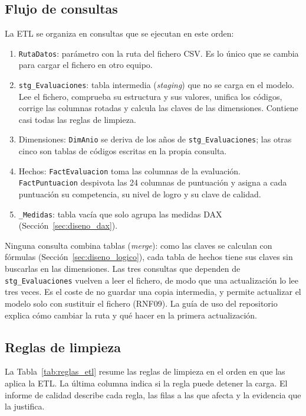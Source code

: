 \documentclass[12pt, a4paper, oneside]{report}
\begin{document}
\subsection{Flujo de consultas}
\label{sec:flujo_consultas}
La ETL se organiza en consultas que se ejecutan en este orden:
\begin{enumerate}
    \item \texttt{RutaDatos}: parámetro con la ruta del fichero CSV. Es lo único que se cambia para cargar el fichero en otro equipo.
    \item \texttt{stg\_Evaluaciones}: tabla intermedia (\textit{staging}) que no se carga en el modelo. Lee el fichero, comprueba su estructura y sus valores, unifica los códigos, corrige las columnas rotadas y calcula las claves de las dimensiones. Contiene casi todas las reglas de limpieza.
    \item Dimensiones: \texttt{DimAnio} se deriva de los años de \texttt{stg\_Evaluaciones}; las otras cinco son tablas de códigos escritas en la propia consulta.
    \item Hechos: \texttt{FactEvaluacion} toma las columnas de la evaluación. \texttt{FactPuntuacion} despivota las 24 columnas de puntuación y asigna a cada puntuación su competencia, su nivel de logro y su clave de calidad.
    \item \texttt{\_Medidas}: tabla vacía que solo agrupa las medidas DAX (Sección~\ref{sec:diseno_dax}).
\end{enumerate}

Ninguna consulta combina tablas (\textit{merge}): como las claves se calculan con fórmulas (Sección~\ref{sec:diseno_logico}), cada tabla de hechos tiene sus claves sin buscarlas en las dimensiones. Las tres consultas que dependen de \texttt{stg\_Evaluaciones} vuelven a leer el fichero, de modo que una actualización lo lee tres veces. Es el coste de no guardar una copia intermedia, y permite actualizar el modelo solo con sustituir el fichero (RNF09). La guía de uso del repositorio explica cómo cambiar la ruta y qué hacer en la primera actualización.

\subsection{Reglas de limpieza}
\label{sec:reglas_limpieza}
La Tabla~\ref{tab:reglas_etl} resume las reglas de limpieza en el orden en que las aplica la ETL. La última columna indica si la regla puede detener la carga. El informe de calidad describe cada regla, las filas a las que afecta y la evidencia que la justifica.
\end{document}
